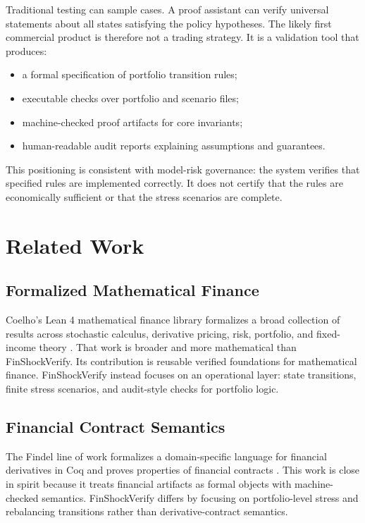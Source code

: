 \documentclass[11pt]{article}
\begin{document}
Traditional testing can sample cases. A proof assistant can verify universal
statements about all states satisfying the policy hypotheses. The likely first
commercial product is therefore not a trading strategy. It is a validation
tool that produces:

\begin{itemize}
  \item a formal specification of portfolio transition rules;
  \item executable checks over portfolio and scenario files;
  \item machine-checked proof artifacts for core invariants;
  \item human-readable audit reports explaining assumptions and guarantees.
\end{itemize}

This positioning is consistent with model-risk governance: the system verifies
that specified rules are implemented correctly. It does not certify that the
rules are economically sufficient or that the stress scenarios are complete.

\section{Related Work}

\subsection{Formalized Mathematical Finance}

Coelho's Lean 4 mathematical finance library formalizes a broad collection of
results across stochastic calculus, derivative pricing, risk, portfolio, and
fixed-income theory \cite{coelho2026leanfinance}. That work is broader and
more mathematical than FinShockVerify. Its contribution is reusable verified
foundations for mathematical finance. FinShockVerify instead focuses on an
operational layer: state transitions, finite stress scenarios, and audit-style
checks for portfolio logic.

\subsection{Financial Contract Semantics}

The Findel line of work formalizes a domain-specific language for financial
derivatives in Coq and proves properties of financial contracts
\cite{arusoaie2019findel,arusoaie2020findelcert}. This work is close in spirit
because it treats financial artifacts as formal objects with machine-checked
semantics. FinShockVerify differs by focusing on portfolio-level stress and
rebalancing transitions rather than derivative-contract semantics.
\end{document}
